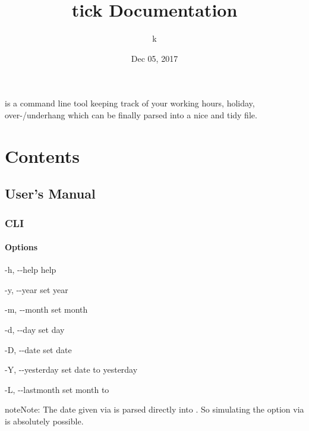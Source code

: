 \documentclass[letterpaper,10pt,english]{sphinxmanual}
\title{tick Documentation}
\date{Dec 05, 2017}
\author{k}
\begin{document}
\maketitle
\sphinxtableofcontents
{}\label{\detokenize{index::doc}}


 is a command line tool keeping track of your working hours, holiday, over-/underhang which can be finally parsed into a nice and tidy  file.


\chapter{Contents}
\label{\detokenize{index:contents}}\label{\detokenize{index:time-clock}}

\section{User’s Manual}
\label{\detokenize{usermanual:users-manual}}\label{\detokenize{usermanual::doc}}

\subsection{CLI}
\label{\detokenize{usermanual:cli}}

\subsubsection{Options}
\label{\detokenize{usermanual:options}}\begin{optionlist}{3cm}
\item [-h, -{-}help]  
help
\item [-y, -{-}year]  
set year
\item [-m, -{-}month]  
set month
\item [-d, -{-}day]  
set day
\item [-D, -{-}date]  
set date
\item [-Y, -{-}yesterday]  
set date to yesterday
\item [-L, -{-}lastmonth]  
set month to 
\end{optionlist}

\begin{sphinxadmonition}{note}{Note:}
The date given via  is parsed directly into . So simulating the option  via  is absolutely possible.
\end{sphinxadmonition}
\end{document}
